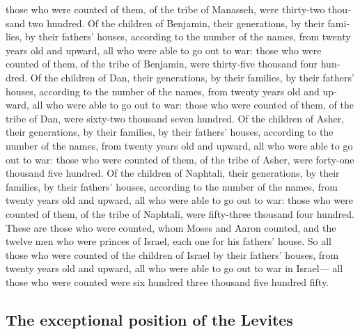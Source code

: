 \begin{paracol}{2}
\begin{otherlanguage}{english}
those who were counted of them, of the tribe of Manasseh, were
thirty-two thousand two hundred.  Of the children of
Benjamin, their generations, by their families, by their fathers'
houses, according to the number of the names, from twenty years old and
upward, all who were able to go out to war:  those who
were counted of them, of the tribe of Benjamin, were thirty-five
thousand four hundred.  Of the children of Dan, their
generations, by their families, by their fathers' houses, according to
the number of the names, from twenty years old and upward, all who were
able to go out to war:  those who were counted of them,
of the tribe of Dan, were sixty-two thousand seven hundred.
 Of the children of Asher, their generations, by their
families, by their fathers' houses, according to the number of the
names, from twenty years old and upward, all who were able to go out to
war:  those who were counted of them, of the tribe of
Asher, were forty-one thousand five hundred.  Of the
children of Naphtali, their generations, by their families, by their
fathers' houses, according to the number of the names, from twenty years
old and upward, all who were able to go out to war: 
those who were counted of them, of the tribe of Naphtali, were
fifty-three thousand four hundred.  These are those who
were counted, whom Moses and Aaron counted, and the twelve men who were
princes of Israel, each one for his fathers' house.  So
all those who were counted of the children of Israel by their fathers'
houses, from twenty years old and upward, all who were able to go out to
war in Israel---  all those who were counted were six
hundred three thousand five hundred fifty.

\hypertarget{the-exceptional-position-of-the-levites}{%
\subsection{The exceptional position of the
Levites}\label{the-exceptional-position-of-the-levites}}


\end{otherlanguage}
\end{paracol}
